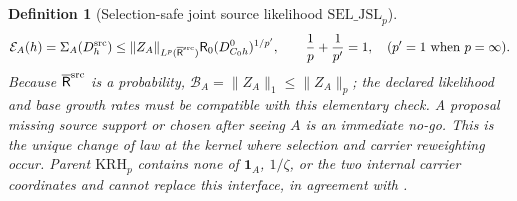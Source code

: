 \documentclass[11pt]{article}
\newtheorem{definition}[theorem]{Definition}
\newcommand{\one}{\mathbf 1}
\begin{document}
\begin{definition}[Selection-safe joint source likelihood
$\mathrm{SEL\_JSL}_{p}$]
\begin{equation}
\label{eq:joint-source-energy-transfer}
 \mathcal E_A(h)=\Sigma_A(D_h^{\rm src})
 \le \|Z_A\|_{L^p(\overline{\mathsf R}^{\rm src})}
       \mathsf R_0(D_{C_0h}^0)^{1/p'},
 \qquad \frac1p+\frac1{p'}=1,
 \quad (p'=1\text{ when }p=\infty).
\end{equation}
Because $\overline{\mathsf R}^{\rm src}$ is a probability,
$\mathcal B_A=\|Z_A\|_1\le\|Z_A\|_p$; the declared likelihood and base
growth rates must be compatible with this elementary check.  A proposal
missing source support or chosen after seeing $A$ is an immediate no-go.
This is the unique change of law at the kernel where selection and carrier
reweighting occur.  Parent $\mathrm{KRH}_p$ contains none of
$\one_A$, $1/\zeta$, or the two internal carrier coordinates and cannot
replace this interface, in agreement with \cite{NiKernel}.
\end{definition}
\end{document}
